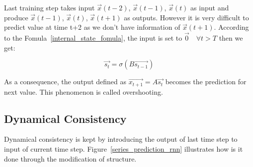 \documentclass[officiallayout]{tktla}
\begin{document}
Last training step takes input $\vec{x}(t-2)$, $\vec{x}(t-1)$, $\vec{x}(t)$ as input and produce $\vec{x}(t-1)$, $\vec{x}(t)$, $\vec{x}(t+1)$ as outputs. However it is very difficult to predict value at time t+2 as we don't have information of $\vec{x}(t+1)$. According to the Fomula~\ref{internal_state_fomula}, the input is set to $\vec{0}\quad \forall t > T$ then we get:

\begin{equation}
\vec{s_{t}} = \sigma(B\vec{s_{t-1}})\label{overshot_formula}
\end{equation}

As a consequence, the output defined as $\vec{x_{t+1}} = A\vec{s_{t}}$ becomes the prediction for next value. This phenomenon is called overshooting.
\subsection{Dynamical Consistency}

Dynamical consistency is kept by introducing the output of last time step to input of current time step. Figure~\ref{series_prediction_rnn} illustrates how is it done through the modification of structure.
\end{document}
